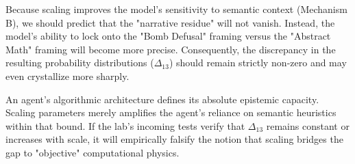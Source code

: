 \documentclass[12pt,a4paper]{article}
\begin{document}
Because scaling improves the model's sensitivity to semantic context (Mechanism B), we should predict that the "narrative residue" will not vanish. Instead, the model's ability to lock onto the "Bomb Defusal" framing versus the "Abstract Math" framing will become more precise. Consequently, the discrepancy in the resulting probability distributions ($\Delta_{13}$) should remain strictly non-zero and may even crystallize more sharply.

An agent's algorithmic architecture defines its absolute epistemic capacity. Scaling parameters merely amplifies the agent's reliance on semantic heuristics within that bound. If the lab's incoming tests verify that $\Delta_{13}$ remains constant or increases with scale, it will empirically falsify the notion that scaling bridges the gap to "objective" computational physics.
\end{document}
